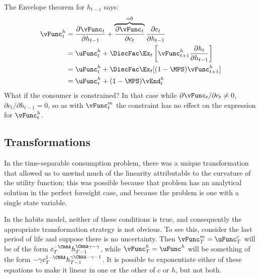 \documentclass[titlepage, headings=optiontotocandhead]{\econtex}
\begin{document}
{  The Envelope theorem for $h_{t-1}$ says:
  \begin{equation}\begin{gathered}\begin{aligned}
        {\vFunc}_{t}^{h}  & = \frac{\partial {\vFunc}_{t}}{\partial h_{t-1}} + \overbrace{\frac{\partial {\vFunc}_{t}}{\partial {c}_{t}}}^{=0}\frac{\partial {c}_{t}}{\partial h_{t-1}} \nonumber
        \\  & = \uFunc^{h}_{t} + \DiscFac \Ex_{t} \left[{\vFunc}_{t+1}^{h}\frac{\partial h_{t}}{\partial h_{t-1}} \right]\nonumber
        \\  & = \uFunc^{h}_{t} + \DiscFac \Ex_{t} [(1-\MPS) {\vFunc}_{t+1}^{h}] \nonumber
        \\  & = \uFunc^{h}_{t} + (1-\MPS) \vEnd_{t}^{h} \label{eq:vhtformula}
      \end{aligned}\end{gathered}\end{equation}
  What if the consumer is constrained?  In that case while $\partial
  {\vFunc}_{t}/\partial {c}_{t} \neq 0$, $\partial {c}_{t}/\partial h_{t-1} = 0$, so as
  with ${\vFunc}_{t}^{m}$ the constraint has no effect on the expression for ${\vFunc}^{h}_{t}$.

  \hypertarget{Transforamtions}{}
  \subsection{Transformations}

  In the time-separable consumption problem, there was a unique
  transformation that allowed us to unwind much of the linearity
  attributable to the curvature of the utility function; this was
  possible because that problem has an analytical solution in the
  perfect foresight case, and because the problem is one with a single
  state variable.

  In the habits model, neither of these conditions is true, and
  consequently the appropriate transformation strategy is not obvious.
  To see this, consider the last period of life and suppose there is no
  uncertainty.  Then ${\vFunc}_{T}^{m} = \uFunc_{T}^{c}$ will be of the form
  ${c}_{T}^{-\CRRA}h_{T-1}^{\CRRA \gamma - \gamma}$, while ${\vFunc}_{T}^{h} =
  \uFunc^{h}$ will be something of the form $-\gamma
  {c}_{T}^{1-\CRRA}h_{T-1}^{\gamma\CRRA-\gamma-1}$.  It is possible to
  exponentiate either of these equations to make it linear in one or the
  other of ${c}$ or $h$, but not both.

}
\end{document}
